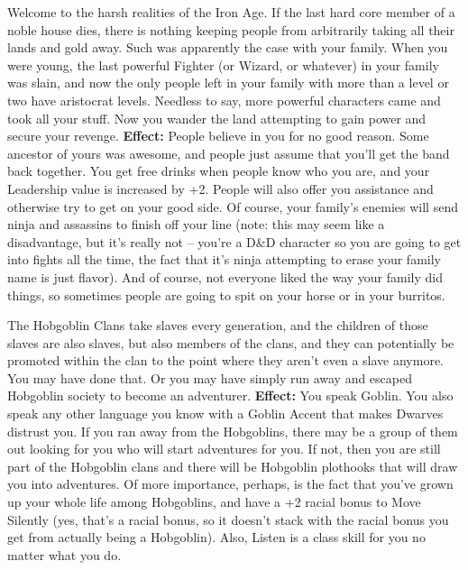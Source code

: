 \medskip{}
{Welcome to the harsh realities of the Iron Age. If the last hard core member of a noble house dies, there is nothing keeping people from arbitrarily taking all their lands and gold away. Such was apparently the case with your family. When you were young, the last powerful Fighter (or Wizard, or whatever) in your family was slain, and now the only people left in your family with more than a level or two have aristocrat levels. Needless to say, more powerful characters came and took all your stuff. Now you wander the land attempting to gain power and secure your revenge.}
\textbf{Effect:}{ People believe in you for no good reason. Some ancestor of yours was awesome, and people just assume that you'll get the band back together. You get free drinks when people know who you are, and your Leadership value is increased by +2. People will also offer you assistance and otherwise try to get on your good side. Of course, your family's enemies will send ninja and assassins to finish off your line (note: this may seem like a disadvantage, but it's really not -- you're a D\&D character so you are going to get into fights all the time, the fact that it's ninja attempting to erase your family name is just flavor). And of course, not everyone liked the way your family did things, so sometimes people are going to spit on your horse or in your burritos.}

\medskip{}
{The Hobgoblin Clans take slaves every generation, and the children of those slaves are also slaves, but also members of the clans, and they can potentially be promoted within the clan to the point where they aren't even a slave anymore. You may have done that. Or you may have simply run away and escaped Hobgoblin society to become an adventurer.}
\textbf{Effect:}{ You speak Goblin. You also speak any other language you know with a Goblin Accent that makes Dwarves distrust you. If you ran away from the Hobgoblins, there may be a group of them out looking for you who will start adventures for you. If not, then you are still part of the Hobgoblin clans and there will be Hobgoblin plothooks that will draw you into adventures. Of more importance, perhaps, is the fact that you've grown up your whole life among Hobgoblins, and have a +2 racial bonus to Move Silently (yes, that's a racial bonus, so it doesn't stack with the racial bonus you get from actually being a Hobgoblin). Also, Listen is a class skill for you no matter what you do.}

